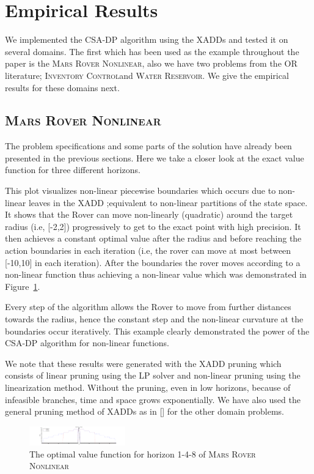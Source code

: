 \documentclass[letterpaper]{article}
\newcommand{\MarsRoverNL}{\textsc{Mars Rover Nonlinear}}
\newcommand{\InventoryControl}{\textsc{Inventory Control}}
\newcommand{\WaterReservoir}{\textsc{Water Reservoir}}
\begin{document}
\section{Empirical Results}

We implemented the CSA-DP algorithm using the XADDs and tested it on several domains. The first which has been used as the example throughout the paper is the \MarsRoverNL, also we have two problems from the OR literature; \InventoryControl and \WaterReservoir. We give the empirical results for these domains next.
\subsection{\MarsRoverNL}
The problem specifications and some parts of the solution have already been presented in the previous sections. Here we take a closer look at the exact value function for three different horizons. 

This plot visualizes non-linear piecewise boundaries which occurs due to non-linear leaves in the XADD ;equivalent to non-linear partitions of the state space. It shows that the Rover can move non-linearly (quadratic) around the target radius (i.e, [-2,2]) progressively to get to the exact point with high precision. It then achieves a constant optimal value after the radius and before reaching the action boundaries in each iteration (i.e, the rover can move at most between [-10,10] in each iteration). After the boundaries the rover moves according to a non-linear function thus achieving a non-linear value which was demonstrated in Figure~\ref{fig:rover}. 

Every step of the algorithm allows the Rover to move from further distances towards the radius, hence the constant step and the non-linear curvature at the boundaries occur iteratively. This example clearly demonstrated the power of the CSA-DP algorithm for non-linear functions.

We note that these results were generated  with the XADD pruning which consists of linear pruning using the LP solver and non-linear pruning using the linearization method.
Without the pruning, even in low horizons, because of infeasible branches, time and space grows exponentially. We have also used the general pruning method of XADDs as in [] for the other domain problems.
\begin{figure}[t]
\begin{center}
\includegraphics[width=0.37\textwidth]{Figures1/rover.pdf}
\end{center}
\vspace{-3mm}
\caption{%
The optimal value function for horizon 1-4-8 of \MarsRoverNL\ 
} \label{fig:rover}
\vspace{-3mm}
\end{figure}
\end{document}
